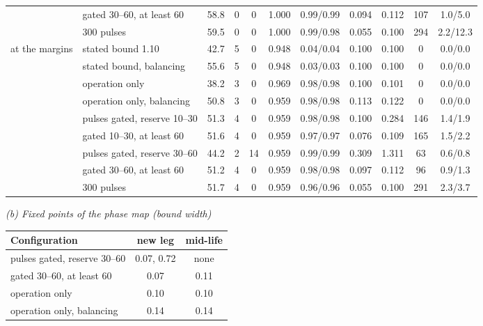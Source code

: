 \begin{table}[htbp]
\begin{tabular*}{\textwidth}{@{\extracolsep{\fill}}llccccccccc@{}}
 & gated 30--60, at least 60 & 58.8 & 0 & 0 & 1.000 & 0.99/0.99 & 0.094 & 0.112 & 107 & 1.0/5.0 \\
 & 300 pulses & 59.5 & 0 & 0 & 1.000 & 0.99/0.98 & 0.055 & 0.100 & 294 & 2.2/12.3 \\
\addlinespace
at the margins & stated bound 1.10 & 42.7 & 5 & 0 & 0.948 & 0.04/0.04 & 0.100 & 0.100 & 0 & 0.0/0.0 \\
 & stated bound, balancing & 55.6 & 5 & 0 & 0.948 & 0.03/0.03 & 0.100 & 0.100 & 0 & 0.0/0.0 \\
 & operation only & 38.2 & 3 & 0 & 0.969 & 0.98/0.98 & 0.100 & 0.101 & 0 & 0.0/0.0 \\
 & operation only, balancing & 50.8 & 3 & 0 & 0.959 & 0.98/0.98 & 0.113 & 0.122 & 0 & 0.0/0.0 \\
 & pulses gated, reserve 10--30 & 51.3 & 4 & 0 & 0.959 & 0.98/0.98 & 0.100 & 0.284 & 146 & 1.4/1.9 \\
 & gated 10--30, at least 60 & 51.6 & 4 & 0 & 0.959 & 0.97/0.97 & 0.076 & 0.109 & 165 & 1.5/2.2 \\
 & pulses gated, reserve 30--60 & 44.2 & 2 & 14 & 0.959 & 0.99/0.99 & 0.309 & 1.311 & 63 & 0.6/0.8 \\
 & gated 30--60, at least 60 & 51.2 & 4 & 0 & 0.959 & 0.98/0.98 & 0.097 & 0.112 & 96 & 0.9/1.3 \\
 & 300 pulses & 51.7 & 4 & 0 & 0.959 & 0.96/0.96 & 0.055 & 0.100 & 291 & 2.3/3.7 \\
\bottomrule
\end{tabular*}

\medskip
\textit{(b) Fixed points of the phase map (bound width)}\\[2pt]
\begin{tabular*}{0.7\textwidth}{@{\extracolsep{\fill}}lcc@{}}
\toprule
Configuration & new leg & mid-life \\
\midrule
pulses gated, reserve 30--60 & 0.07, 0.72 & none \\
gated 30--60, at least 60 & 0.07 & 0.11 \\
operation only & 0.10 & 0.10 \\
operation only, balancing & 0.14 & 0.14 \\
\bottomrule
\end{tabular*}
\end{table}


